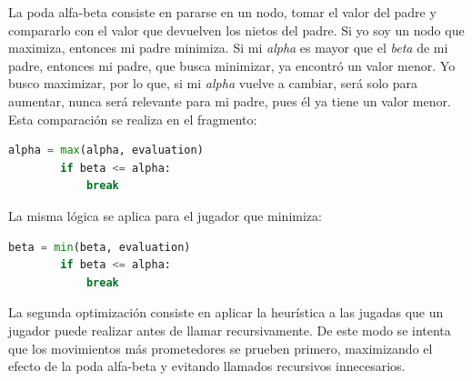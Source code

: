 \documentclass[spanish]{article}
\begin{document}
La poda alfa-beta consiste en pararse en un nodo, tomar el valor del padre y compararlo con el valor que devuelven los nietos del padre. Si yo soy un nodo que maximiza, entonces mi padre minimiza. Si mi \textit{alpha} es mayor que el \textit{beta} de mi padre, entonces mi padre, que busca minimizar, ya encontr\'o un valor menor. Yo busco maximizar, por lo que, si mi \textit{alpha} vuelve a cambiar, ser\'a solo para aumentar, nunca ser\'a relevante para mi padre, pues \'el ya tiene un valor menor.
Esta comparaci\'on se realiza en el fragmento:
\begin{lstlisting}[language=Python]
    alpha = max(alpha, evaluation)
        if beta <= alpha:
            break
\end{lstlisting}

La misma l\'ogica se aplica para el jugador que minimiza:
\begin{lstlisting}[language=Python]
    beta = min(beta, evaluation)
        if beta <= alpha:
            break
\end{lstlisting}

La segunda optimizaci\'on consiste en aplicar la heur\'istica a las jugadas que un jugador puede realizar antes de llamar recursivamente. De este modo se intenta que los movimientos m\'as prometedores se prueben primero, maximizando el efecto de la poda alfa-beta y evitando llamados recursivos innecesarios.\\
\end{document}
